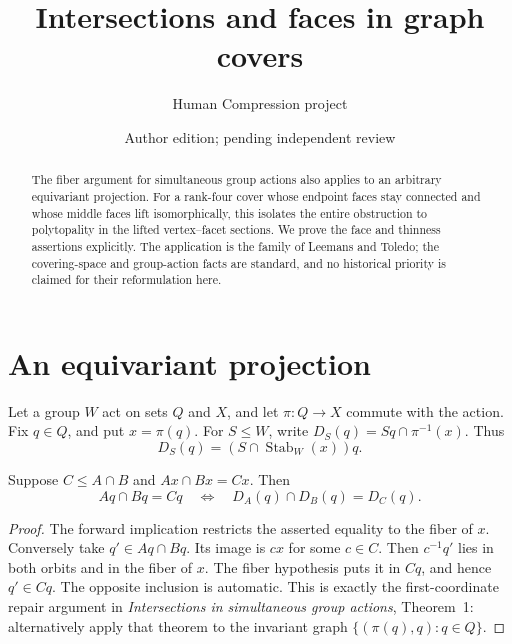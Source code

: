 \documentclass[a4paper,11pt]{article}
\title{Intersections and faces in graph covers}
\author{Human Compression project}\date{Author edition; pending independent review}
\newcommand{\Stab}{\operatorname{Stab}}\newcommand{\Aut}{\operatorname{Aut}}
\begin{document}
\maketitle
\begin{abstract}
The fiber argument for simultaneous group actions also applies to an arbitrary
equivariant projection. For a rank-four cover whose endpoint faces stay connected
and whose middle faces lift isomorphically, this isolates the entire obstruction
to polytopality in the lifted vertex--facet sections. We prove the face and
thinness assertions explicitly. The application is the family of Leemans and
Toledo; the covering-space and group-action facts are standard, and no historical
priority is claimed for their reformulation here.
\end{abstract}

\section{An equivariant projection}
Let a group $W$ act on sets $Q$ and $X$, and let $\pi:Q\to X$ commute
with the action. Fix $q\in Q$, and put $x=\pi(q)$. For $S\leq W$, write
$D_S(q)=Sq\cap\pi^{-1}(x)$. Thus
\[
D_S(q)=(S\cap\Stab_W(x))q.
\]
\begin{lemma}\label{projection}
Suppose $C\leq A\cap B$ and $Ax\cap Bx=Cx$. Then
\[
Aq\cap Bq=Cq\quad\Longleftrightarrow\quad
D_A(q)\cap D_B(q)=D_C(q).
\]
\end{lemma}
\begin{proof}
The forward implication restricts the asserted equality to the fiber of $x$.
Conversely take $q'\in Aq\cap Bq$. Its image is $cx$ for some $c\in C$.
Then $c^{-1}q'$ lies in both orbits and in the fiber of $x$. The fiber
hypothesis puts it in $Cq$, and hence $q'\in Cq$. The opposite inclusion
is automatic. This is exactly the first-coordinate repair argument in
\emph{Intersections in simultaneous group actions}, Theorem~1: alternatively
apply that theorem to the invariant graph $\{(\pi(q),q):q\in Q\}$.
\end{proof}
\end{document}
